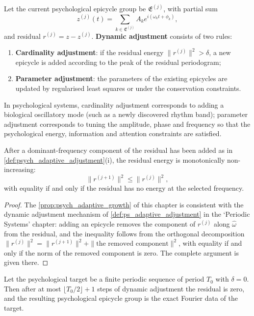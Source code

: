 \begin{definition}\label{def:psych_adaptive_adjustment}
Let the current psychological epicycle group be $\mathfrak E^{(j)}$, with partial sum
\[
z^{(j)}(t)=\sum_{k\in\mathfrak E^{(j)}}A_k e^{i(\omega_k t+\phi_k)},
\]
and residual $r^{(j)}=z-z^{(j)}$. \textbf{Dynamic adjustment} consists of two rules:
\begin{enumerate}[label=(\roman*)]
    \item \textbf{Cardinality adjustment}: if the residual energy $\|r^{(j)}\|^2>\delta$, a new epicycle is added according to the peak of the residual periodogram;
    \item \textbf{Parameter adjustment}: the parameters of the existing epicycles are updated by regularised least squares or under the conservation constraints.
\end{enumerate}
In psychological systems, cardinality adjustment corresponds to adding a biological oscillatory mode (such as a newly discovered rhythm band); parameter adjustment corresponds to tuning the amplitude, phase and frequency so that the psychological energy, information and attention constraints are satisfied.
\end{definition}

\begin{proposition}\label{prop:psych_adaptive_growth}
After a dominant-frequency component of the residual has been added as in \cref{def:psych_adaptive_adjustment}(i), the residual energy is monotonically non-increasing:
\[
\|r^{(j+1)}\|^2\le\|r^{(j)}\|^2,
\]
with equality if and only if the residual has no energy at the selected frequency.
\end{proposition}

\begin{proof}
The \cref{prop:psych_adaptive_growth} of this chapter is consistent with the dynamic adjustment mechanism of \cref{def:ps_adaptive_adjustment} in the `Periodic Systems' chapter:
adding an epicycle removes the component of $r^{(j)}$ along $\hat\omega$ from the residual, and the inequality follows from the orthogonal decomposition
$\|r^{(j)}\|^2=\|r^{(j+1)}\|^2+\|\text{the removed component}\|^2$,
with equality if and only if the norm of the removed component is zero. The complete argument is given there.
\end{proof}

\begin{theorem}\label{thm:psych_adaptive_convergence}
Let the psychological target be a finite periodic sequence of period $T_0$ with $\delta=0$. Then after at most $\lfloor T_0/2\rfloor+1$ steps of dynamic adjustment the residual is zero, and the resulting psychological epicycle group is the exact Fourier data of the target.
\end{theorem}

